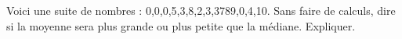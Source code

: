 
\begin{exercice}\label{exoSeconde-0028}

    Voici une suite de nombres : 0,0,0,5,3,8,2,3,3789,0,4,10. Sans faire de calculs, dire si la moyenne sera plus grande ou plus petite que la médiane. Expliquer.

\end{exercice}
